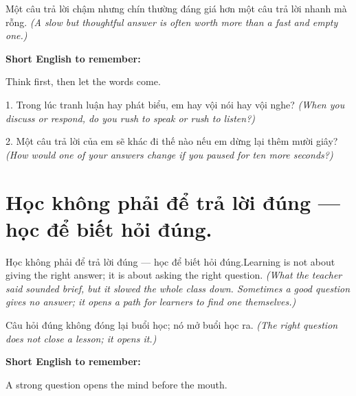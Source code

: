 \begin{baihoc}
Một câu trả lời chậm nhưng chín thường đáng giá hơn một câu trả lời nhanh mà rỗng.
\textit{(A slow but thoughtful answer is often worth more than a fast and empty one.)}
\end{baihoc}

\begin{ghinhoanh}
\textbf{Short English to remember:}

Think first, then let the words come.

\end{ghinhoanh}

\begin{tuhocnhanh}
1. Trong lúc tranh luận hay phát biểu, em hay vội nói hay vội nghe? \textit{(When you discuss or respond, do you rush to speak or rush to listen?)}

2. Một câu trả lời của em sẽ khác đi thế nào nếu em dừng lại thêm mười giây? \textit{(How would one of your answers change if you paused for ten more seconds?)}
\end{tuhocnhanh}
\ngancach


\section{Học không phải để trả lời đúng — học để biết hỏi đúng.}
\begin{truyen}{Học không phải để trả lời đúng — học để biết hỏi đúng.}{Learning is not about giving the right answer; it is about asking the right question.}
\textit{(What the teacher said sounded brief, but it slowed the whole class down. Sometimes a good question gives no answer; it opens a path for learners to find one themselves.)}
\end{truyen}

\begin{baihoc}
Câu hỏi đúng không đóng lại buổi học; nó mở buổi học ra.
\textit{(The right question does not close a lesson; it opens it.)}
\end{baihoc}

\begin{ghinhoanh}
\textbf{Short English to remember:}

A strong question opens the mind before the mouth.

\end{ghinhoanh}

